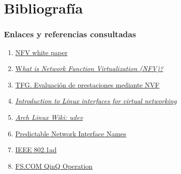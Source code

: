 \documentclass[a4paper, oneside, 12pt]{book}
\begin{document}
	\chapter{Bibliografía}
	
	\subsection*{Enlaces y referencias consultadas}
	\begin{enumerate}
		\item
		\label{paper nfv 2012}
		\href{https://portal.etsi.org/nfv/nfv_white_paper.pdf}{NFV white paper}
		
		\item
		\label{bib: what is nfv}
		\href{https://www.ciena.com/insights/articles/What-is-NFV-prx.html}{W\textit{hat is Network Function Virtualization (NFV)?}}
		
		\item
		\label{bib: virt ligera}
		\href{https://upcommons.upc.edu/handle/2117/78028?show=full}{TFG. Evaluación de prestaciones mediante NVF}
		
		\item
		\label{bib:virtual interface list}
		\href{https://developers.redhat.com/blog/2018/10/22/introduction-to-linux-interfaces-for-virtual-networking#veth}{\textit{Introduction to Linux interfaces for virtual networking}}
		
		\item
		\label{bib: udev archwiki}
		\href{https://wiki.archlinux.org/title/Udev}{\textit{Arch Linux Wiki: udev}}
		
		\item
		\label{bib: systemd networkd v197}
		\href{https://www.freedesktop.org/wiki/Software/systemd/PredictableNetworkInterfaceNames/}{Predictable Network Interface Names}
		
		\item
		\label{bib: 802.1ad}
		\href{http://www.microhowto.info/tags/802.1ad.html}{IEEE 802.1ad}
		
		\item
		\label{bib: FS QinQ}
		\href{https://img-en.fs.com/file/user_manual/s3800-series-qinq-operation.pdf}{FS.COM QinQ Operation}
		

\end{enumerate}
\end{document}
